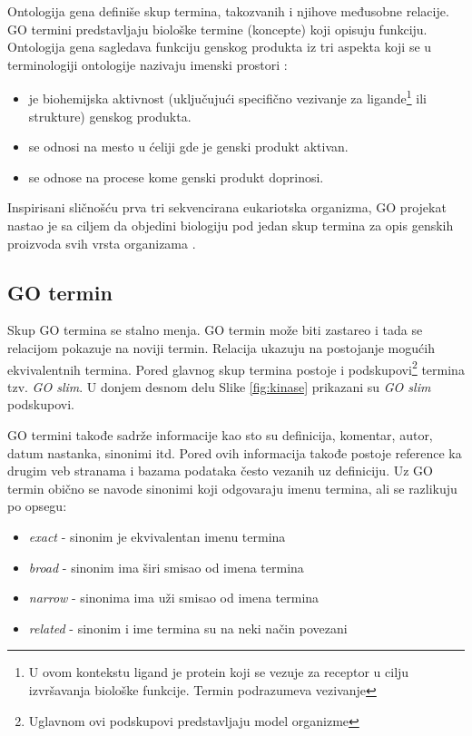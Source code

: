 Ontologija gena definiše skup termina, takozvanih 
 i njihove međusobne relacije. GO termini predstavljaju biološke
termine (koncepte) koji opisuju funkciju. Ontologija gena sagledava funkciju
genskog produkta iz tri aspekta koji se u terminologiji ontologije nazivaju
imenski prostori :
\begin{itemize}
  \item {} je biohemijska aktivnost (uključujući
    specifično vezivanje za ligande\footnote{
      U ovom kontekstu ligand je protein koji se vezuje za receptor u cilju
      izvršavanja biološke funkcije. Termin podrazumeva vezivanje 
    } ili strukture) genskog produkta.
  \item {} se odnosi na mesto u ćeliji gde je
    genski produkt aktivan.
  \item {} se odnose na procese kome genski produkt
    doprinosi.
\end{itemize}

Inspirisani sličnošću prva tri sekvencirana eukariotska organizma, GO projekat
nastao je sa ciljem da  objedini biologiju pod jedan skup termina za opis
genskih proizvoda svih vrsta organizama \parencite{GO2000}.

\subsection{GO termin}

Skup GO termina se stalno menja. GO termin može biti zastareo i tada se
relacijom  pokazuje na noviji termin. Relacija
 ukazuju na postojanje mogućih ekvivalentnih termina. Pored
glavnog skup termina postoje i podskupovi\footnote{Uglavnom ovi podskupovi
predstavljaju model organizme} termina tzv. \textit{GO slim}. U donjem desnom
delu Slike \ref{fig:kinase} prikazani su \textit{GO slim} podskupovi.

GO termini takođe sadrže informacije kao sto su definicija, komentar, autor, datum
nastanka, sinonimi itd. Pored ovih informacija takođe postoje reference ka
drugim veb stranama i bazama podataka često vezanih uz definiciju.  Uz GO termin
obično se navode sinonimi koji odgovaraju imenu termina, ali se razlikuju po
opsegu:
\begin{itemize}
  \item \textit{exact} - sinonim je ekvivalentan imenu termina
  \item \textit{broad} - sinonim ima širi smisao od imena termina
  \item \textit{narrow} - sinonima ima uži smisao od imena termina
  \item \textit{related} - sinonim i ime termina su na neki način povezani
\end{itemize}

